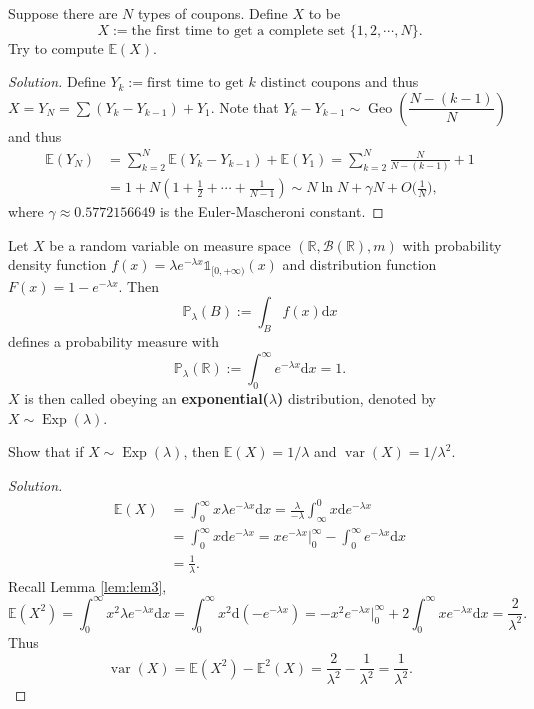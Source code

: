 \documentclass[11pt,singlecolumn, openany, citestyle=authoryear]{elegantbook}
\begin{document}
\begin{CJK}{UTF8}{gbsn}
\begin{example} Suppose there are $N$ types of coupons. Define $X$ to be 
    $$
    X:= \text{the first time to get a complete set } \{1,2,\cdots,N\}.
    $$
    Try to compute $\mathbb{E}(X)$.
\end{example}
\begin{proof}[Solution]
    Define $Y_k:=\text{first time to get }k \text{ distinct coupons}$ and thus 
    $X=Y_N=\sum(Y_k-Y_{k-1})+Y_1$. Note that $Y_k-Y_{k-1}\sim \operatorname{Geo}\left(
        \dfrac{N-(k-1)}{N}
    \right)$ and thus 
    \begin{align*}
    \mathbb{E}(Y_N)&=\sum_{k=2}^N\mathbb{E}(Y_k-Y_{k-1})+\mathbb{E}(Y_1)
    =\sum_{k=2}^N\frac{N}{N-(k-1)}+1\\
    &=1+N(1+\frac{1}{2}+\cdots+\frac{1}{N-1})\sim N\ln N+\gamma N+O\biggl(
        \frac{1}{N}
    \biggr),
    \end{align*}
    where $\gamma\approx 0.5772156649$ is the Euler-Mascheroni constant.
\end{proof}

\begin{example}[(Exponential)]
    Let $X$ be a random variable on measure space $(\mathbb{R},\mathcal{B}(\mathbb{R}),m)$
    with probability density function $f(x)=\lambda e^{-\lambda x}\mathds{1}_{[0,+\infty)}(x)$
    and distribution function $F(x)=1-e^{-\lambda x}$.
    Then 
    $$
    \mathbb{P}_\lambda (B):=\int_B f(x)\mathrm{d}x
    $$
    defines a probability measure with 
    $$
    \mathbb{P}_\lambda (\mathbb{R}):=\int_0^\infty e^{-\lambda x}\mathrm{d}x=1.
    $$
    $X$ is then called obeying an \textbf{exponential($\lambda$)} distribution, denoted by 
    $X\sim \operatorname{Exp}(\lambda)$.
\end{example}

\begin{exercise}
    Show that if $X\sim \operatorname{Exp}(\lambda)$, then 
    $\mathbb{E}(X)=1/\lambda$ and $\operatorname{var}(X)=1/\lambda^2$.
\end{exercise}
\begin{proof}[Solution]
        \begin{align*}
            \mathbb{E}(X)&=\int_{0}^\infty x\lambda e^{-\lambda x}\mathrm{d}x 
            =\frac{\lambda}{-\lambda}\int_{\infty}^0 x\mathrm{d}e^{-\lambda x}\\
            &=\int^{\infty}_0 x\mathrm{d}e^{-\lambda x}=xe^{-\lambda x}\bigg|_{0}^\infty - 
            \int_0^\infty e^{-\lambda x}\mathrm{d}x\\
            &=\frac{1}{\lambda}.
        \end{align*}
        Recall Lemma \ref{lem:lem3},
        $$
        \mathbb{E}(X^2)=\int_0^\infty x^2 \lambda e^{-\lambda x}\mathrm{d}x=
        \int_0^\infty x^2 \mathrm{d}(-e^{-\lambda x})=-x^2e^{-\lambda x}\bigg|_{0}^\infty+
        2\int_0^\infty xe^{-\lambda x}\mathrm{d}x = \frac{2}{\lambda^2}.
        $$
        Thus 
        $$\operatorname{var}(X)=\mathbb{E}(X^2)-\mathbb{E}^2(X)=\frac{2}{\lambda^2}-
        \frac{1}{\lambda^2}=\frac{1}{\lambda^2}.
        $$
\end{proof}


\end{CJK}
\end{document}
